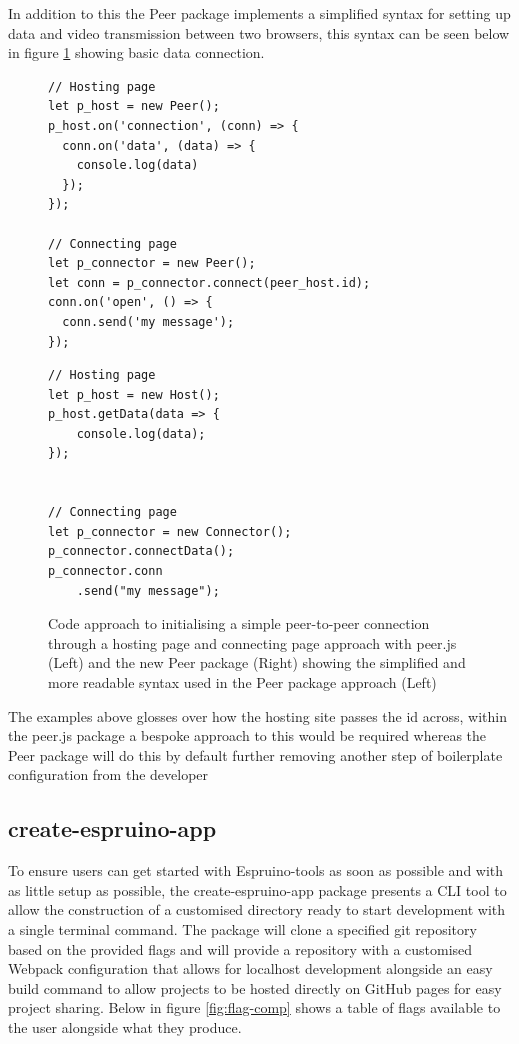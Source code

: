 \documentclass{l4proj}
\begin{document}
\text In addition to this the Peer package implements a simplified syntax for setting up data and video transmission between two browsers, this syntax can be seen below in figure \ref{fig:peer-syntax} showing basic data connection.

\begin{figure}[!ht]
\centering
\begin{minipage}{7cm}
  \centering
  \begin{lstlisting}
// Hosting page
let p_host = new Peer();
p_host.on('connection', (conn) => {
  conn.on('data', (data) => {
    console.log(data)
  });
});

// Connecting page
let p_connector = new Peer();
let conn = p_connector.connect(peer_host.id);
conn.on('open', () => {
  conn.send('my message');
});
  \end{lstlisting}
\end{minipage}
\hspace{1cm}
\begin{minipage}{5.5cm}
  \centering
  
  \begin{lstlisting}
// Hosting page
let p_host = new Host();
p_host.getData(data => {
    console.log(data);
});
 

// Connecting page
let p_connector = new Connector();
p_connector.connectData();
p_connector.conn
    .send("my message");

  \end{lstlisting}

\end{minipage}
  \caption{Code approach to initialising a simple peer-to-peer connection through a hosting page and connecting page approach with peer.js (Left) and the new Peer package (Right) showing the simplified and more readable syntax used in the Peer package approach (Left)}
  \label{fig:peer-syntax}
\end{figure}

The examples above glosses over how the hosting site passes the id across, within the peer.js package a bespoke approach to this would be required whereas the Peer package will do this by default further removing another step of boilerplate configuration from the developer


\subsection{create-espruino-app}
To ensure users can get started with Espruino-tools as soon as possible and with as little setup as possible, the create-espruino-app package presents a CLI tool to allow the construction of a customised directory ready to start development with a single terminal command. The package will clone a specified git repository based on the provided flags and will provide a repository with a customised Webpack configuration that allows for localhost development alongside an easy build command to allow projects to be hosted directly on GitHub pages for easy project sharing. Below in figure \ref{fig:flag-comp} shows a table of flags available to the user alongside what they produce.
\end{document}
